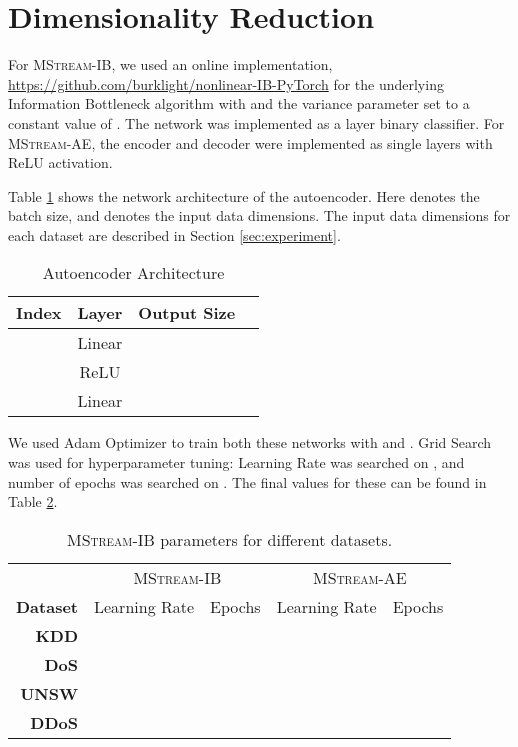 \documentclass[sigconf]{acmart}
\newcommand{\method}{\textsc{MStream}}
\begin{document}
\section{Dimensionality Reduction}
\label{sec:app1}
For \method-IB, we used an online implementation, \url{https://github.com/burklight/nonlinear-IB-PyTorch} for the underlying Information Bottleneck algorithm with  and the variance parameter set to a constant value of . The network was implemented as a  layer binary classifier. For \method-AE, the encoder and decoder were implemented as single layers with ReLU activation.

Table \ref{tab:aearch} shows the network architecture of the autoencoder. Here  denotes the batch size, and  denotes the input data dimensions. The input data dimensions for each dataset are described in Section \ref{sec:experiment}.  
\begin{table}[!htb]
\begin{center}
\caption{Autoencoder Architecture}
\label{tab:aearch}
\begin{tabular}{@{}rccc@{}}
\toprule
\textbf{Index} & \textbf{Layer} & \textbf{Output Size}  \\ \midrule
 \ \ \ \ & Linear & \\
 \ \ \ \ & ReLU & \\
 \ \ \ \ & Linear & \\
\bottomrule
\end{tabular}
\end{center}
\end{table}

We used Adam Optimizer to train both these networks with  and . Grid Search was used for hyperparameter tuning:  Learning Rate was searched on , and number of epochs was searched on . The final values for these  can be found in Table \ref{tab:ibparam}.
\begin{table}[!htb]
\centering
\caption{\method-IB parameters for different datasets.}
\label{tab:ibparam}
\begin{tabular}{@{}rcccc@{}}
\toprule
& \multicolumn{2}{c}{\method-IB} & \multicolumn{2}{c}{\method-AE} \\
 \textbf{Dataset} & Learning Rate  &  Epochs & Learning Rate  & Epochs  \\ \midrule
 \textbf{KDD} &  &  &  & \\
 \textbf{DoS} &  &   &  &  \\
 \textbf{UNSW} &  &  &  & \\
\textbf{DDoS} &  &  &  & \\
\bottomrule
\end{tabular}
\end{table}
\end{document}
